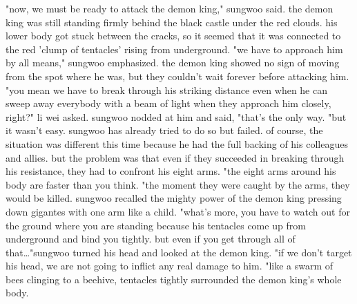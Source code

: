 "now, we must be ready to attack the demon king," sungwoo said.
 the demon king was still standing firmly behind the black castle under the red clouds.
his lower body got stuck between the cracks, so it seemed that it was connected to the red 'clump of tentacles' rising from underground.
 "we have to approach him by all means," sungwoo emphasized.
 the demon king showed no sign of moving from the spot where he was, but they couldn't wait forever before attacking him.
 "you mean we have to break through his striking distance even when he can sweep away everybody with a beam of light when they approach him closely, right?" li wei asked.
 sungwoo nodded at him and said, "that's the only way.
"but it wasn't easy.
 sungwoo has already tried to do so but failed.
of course, the situation was different this time because he had the full backing of his colleagues and allies.
 but the problem was that even if they succeeded in breaking through his resistance, they had to confront his eight arms.
"the eight arms around his body are faster than you think.
"the moment they were caught by the arms, they would be killed.
 sungwoo recalled the mighty power of the demon king pressing down gigantes with one arm like a child.
"what's more, you have to watch out for the ground where you are standing because his tentacles come up from underground and bind you tightly.
 but even if you get through all of that…"sungwoo turned his head and looked at the demon king.
"if we don't target his head, we are not going to inflict any real damage to him.
"like a swarm of bees clinging to a beehive, tentacles tightly surrounded the demon king's whole body.


